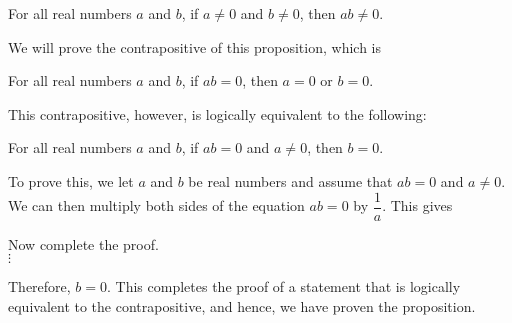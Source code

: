 \begin{prog}
\begin{enumerate}
\begin{proposition}\label{P:abnotzero}
For all real numbers $a$ and $b$, if $ a \ne 0$ and $ b \ne 0 $, then $ ab \ne 0 $.
\end{proposition}
\end{enumerate}

\begin{myproof}
We will prove the contrapositive of this proposition, which is
\begin{center}
For all real numbers $a$ and $b$, if  $ab = 0$, then  $a = 0\text{  or  }b = 0$.
\end{center}

\noindent
This contrapositive, however, is logically equivalent to the following:
\begin{center}
For all real numbers $a$ and $b$, if $ab = 0$ and $a \ne 0$, then $b = 0$.
\end{center}
To prove this, we let $a$ and $b$ be real numbers and assume that  $ab = 0$ and $a \ne 0$.  We can then multiply both sides of the equation  $ab = 0$  by  $ \dfrac{1}{a} $.  This gives
\begin{center}
Now complete the proof. \\
$\vdots$
\end{center}
\quarter

%
%
Therefore, $b = 0$.  This completes the proof of a statement that is logically equivalent to the contrapositive, and hence, we have proven the proposition.
\end{myproof}
\end{prog}
\hbreak


\endinput
